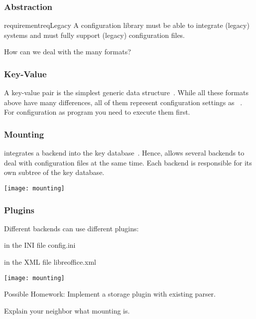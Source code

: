 \documentclass{beamer}
\begin{document}
\begin{frame}
	\frametitle{Abstraction}
	\begin{restatable}{requirement}{reqLegacy}
	A configuration library must be able to integrate (legacy) systems and must fully support (legacy) configuration files.%
	\label{req:legacy}
	\end{restatable}

	\vspace{1cm}

	How can we deal with the many formats?
\end{frame}


\begin{frame}
	\frametitle{Key-Value}
A key-value pair is the simplest generic data structure~\cite{strang2004context}.
While all these formats above have many differences, all of them represent configuration settings as ~\cite{jin2014configurations,rabkin2011static,xu2013blame,lathia2013open}.
\\[1cm]

For configuration as program you need to execute them first.
\end{frame}

\begin{frame}
	\frametitle{Mounting}
	 integrates a backend into the key database~\cite{raab2008thesis}.
	Hence, \elektra{} allows several backends to deal with configuration files at the same time.
	Each backend is responsible for its own subtree of the key database.

	\texttt{[image: mounting]}
\end{frame}

\begin{frame}
	\frametitle{Plugins}

	Different backends can use different plugins:
	\begin{description}[labelsep=10cm,align=right]
	\item[\texttt{/sw}] in the INI file config.ini
	\item[\texttt{/sw/libreoffice}] in the XML file libreoffice.xml
	\end{description}

	\texttt{[image: mounting]}
\end{frame}

\begin{assignment}
	\begin{task}
	Possible Homework: Implement a storage plugin with existing parser.
	\end{task}

	\begin{task}
	Explain your neighbor what mounting is.
	\end{task}
\end{assignment}
\end{document}
